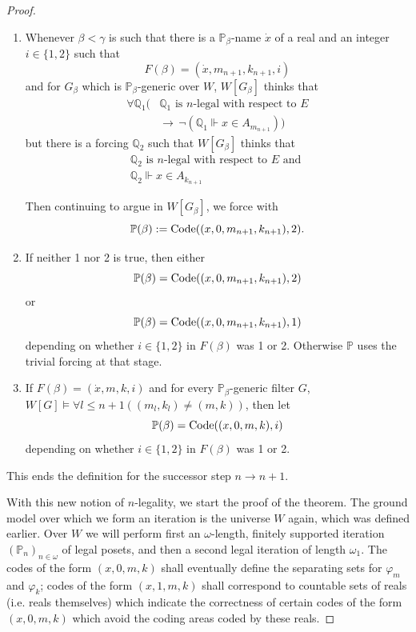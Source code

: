 \documentclass[10pt,a4paper]{amsart}
\newcommand{\forceP}{\mathbb{P}}
\newcommand{\forceQ}{\mathbb{Q}}
\begin{document}
\begin{proof}
\begin{enumerate}
\item
Whenever $\beta < \gamma $ is such that there is a $\forceP_{\beta}$-name $\dot{x}$ of a real and an integer $ i\in\{1,2\}$ such that
\[F(\beta)= (\dot{x},m_{n+1},k_{n+1},i)\] and for $G_{\beta}$ which is $\forceP_{\beta}$-generic over $W$, $W[G_{\beta}]$ thinks that
\begin{align*}
\forall \forceQ_1 (&\forceQ_1 \text{ is } n \text{-legal with respect to } E  \\& \rightarrow \, \lnot(\forceQ_1 \Vdash x \in A_{m_{n+1}}))
\end{align*}
but there is a forcing $\forceQ_2$ such that $W[G_{\beta}]$ thinks that 
\begin{align*}
\forceQ_{2} \text{ is } n \text{-legal with respect to $E$ and } \\   {\forceQ_2} \Vdash x \in A_{k_{n+1}}
\end{align*}


Then continuing to argue in $W[G_{\beta}]$, we force with
\[\forceP(\beta):= \hbox{Code}((x,0,m_{n+1},k_{n+1}),2).\] 




\item If neither 1 nor 2 is true, then either \[ \forceP(\beta)=\hbox{Code}((x,0,m_{n+1},k_{n+1}),2)\] or 
\[ \forceP(\beta)=\hbox{Code}((x,0,m_{n+1},k_{n+1}),1)\] depending on whether $ i\in\{1,2\}$ in $F(\beta)$ was 1 or 2. Otherwise $\forceP$ uses the trivial forcing at that stage. 

\item 
If $F(\beta) = (\dot{x},m,k,i)$ and for every $\forceP_{\beta}$-generic filter $G$, $W[G] \models \forall l \le n+1 ((m_l,k_l) \ne (m,k))$,
then let
\[ \forceP(\beta)=\hbox{Code}((x,0,m,k),i)\] depending on whether $ i\in\{1,2\}$ in $F(\beta)$ was 1 or 2.  
\end{enumerate} 
This ends the definition for the successor step $n \rightarrow n+1$.

With this new notion of $n$-legality, we start the proof of the theorem. The ground model over which we form an iteration is the universe $W$ again, which was defined earlier. Over $W$ we will perform first an $\omega$-length, finitely supported iteration $(\forceP_n)_{n \in \omega}$ of legal posets, and then a second legal iteration of length $\omega_1$. The codes of the form $(x,0,m,k)$ shall eventually define the separating sets for $\varphi_m$ and $\varphi_k$; codes of the form $(x,1,m,k)$ shall correspond to countable sets of reals  (i.e. reals themselves) which indicate the correctness of certain codes of the form $(x,0,m,k)$ which avoid the coding areas coded by these reals.


\end{proof}
\end{document}
